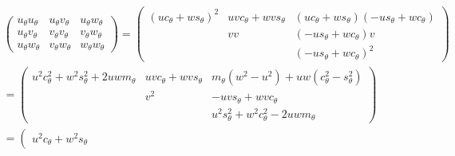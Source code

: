 \documentclass[a4paper,12pt]{article}
\begin{document}
\begin{align} 
  \left(\begin{array}{ccc} 
    u_\theta u_\theta & u_\theta v_\theta & u_\theta w_\theta \\ 
    u_\theta v_\theta & v_\theta v_\theta & v_\theta w_\theta \\ 
    u_\theta w_\theta & v_\theta w_\theta & w_\theta w_\theta 
  \end{array} \right) =
  \left(\begin{array}{ccc} 
    (u c_\theta + w s_\theta )^2&
    uvc_\theta +wvs_\theta&
    (uc_\theta +ws_\theta)(-us_\theta +wc_\theta)\\
    & vv & (-us_\theta+wc_\theta)v\\ 
    && (-us_\theta +w c_\theta)^2 \end{array}\right)\\
  = \left(\begin{array}{ccc}  
    u^2c_\theta^2 +w^2 s_\theta^2 + 2uw m_\theta&
    uvc_\theta +wvs_\theta&
    m_\theta (w^2-u^2)+uw(c_\theta^2 -s_\theta^2) \\
    &v^2& -uvs_\theta + wvc_\theta\\
    && u^2s_\theta^2 + w^2 c_\theta^2 - 2uw m_\theta
    \end{array}\right) \\ 
  = \left(\begin{array}{ccc} 
    u^2c_\theta +w^2s_\theta
  \end{array}
\end{align} 
\end{document}
